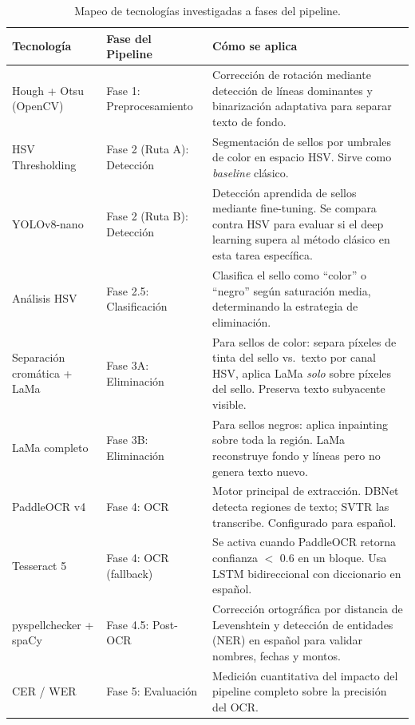\documentclass[11pt, a4paper]{article}
\begin{document}
\begin{table}[H]
\centering
\small
\begin{tabular}{@{}p{3cm}p{3.5cm}p{6.5cm}@{}}
\toprule
\textbf{Tecnología} & \textbf{Fase del Pipeline} & \textbf{Cómo se aplica} \\
\midrule
Hough + Otsu (OpenCV) & Fase 1: Preprocesamiento & Corrección de rotación mediante detección de líneas dominantes y binarización adaptativa para separar texto de fondo. \\
\midrule
HSV Thresholding & Fase 2 (Ruta A): Detección & Segmentación de sellos por umbrales de color en espacio HSV. Sirve como \textit{baseline} clásico. \\
\midrule
YOLOv8-nano & Fase 2 (Ruta B): Detección & Detección aprendida de sellos mediante fine-tuning. Se compara contra HSV para evaluar si el deep learning supera al método clásico en esta tarea específica. \\
\midrule
Análisis HSV & Fase 2.5: Clasificación & Clasifica el sello como ``color'' o ``negro'' según saturación media, determinando la estrategia de eliminación. \\
\midrule
Separación cromática + LaMa & Fase 3A: Eliminación & Para sellos de color: separa píxeles de tinta del sello vs.\ texto por canal HSV, aplica LaMa \textit{solo} sobre píxeles del sello. Preserva texto subyacente visible. \\
\midrule
LaMa completo & Fase 3B: Eliminación & Para sellos negros: aplica inpainting sobre toda la región. LaMa reconstruye fondo y líneas pero no genera texto nuevo. \\
\midrule
PaddleOCR v4 & Fase 4: OCR & Motor principal de extracción. DBNet detecta regiones de texto; SVTR las transcribe. Configurado para español. \\
\midrule
Tesseract 5 & Fase 4: OCR (fallback) & Se activa cuando PaddleOCR retorna confianza $<$ 0.6 en un bloque. Usa LSTM bidireccional con diccionario en español. \\
\midrule
pyspellchecker + spaCy & Fase 4.5: Post-OCR & Corrección ortográfica por distancia de Levenshtein y detección de entidades (NER) en español para validar nombres, fechas y montos. \\
\midrule
CER / WER & Fase 5: Evaluación & Medición cuantitativa del impacto del pipeline completo sobre la precisión del OCR. \\
\bottomrule
\end{tabular}
\caption{Mapeo de tecnologías investigadas a fases del pipeline.}
\end{table}
\end{document}
